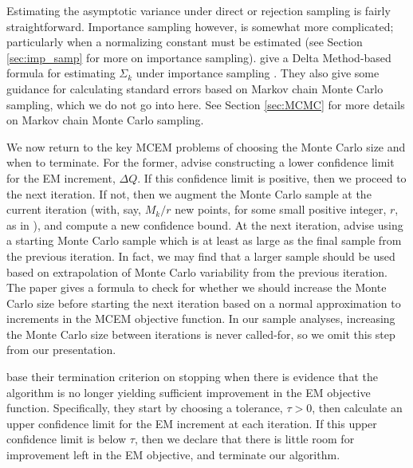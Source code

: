 \documentclass[11pt, oneside]{article}   	%
\begin{document}
Estimating the asymptotic variance under direct or rejection sampling is fairly straightforward. Importance sampling however, is somewhat more complicated; particularly when a normalizing constant must be estimated (see Section \ref{sec:imp_samp} for more on importance sampling). \citeauthor{Caf05} give a Delta Method-based formula for estimating $\Sigma_k$ under importance sampling \citep[see Chapter 3 of][for an overview of the Delta Method]{van98}. They also give some guidance for calculating standard errors based on Markov chain Monte Carlo sampling, which we do not go into here. See Section \ref{sec:MCMC} for more details on Markov chain Monte Carlo sampling. 

We now return to the key MCEM problems of choosing the Monte Carlo size and when to terminate. For the former, \citeauthor{Caf05} advise constructing a lower confidence limit for the EM increment, $\Delta Q$. If this confidence limit is positive, then we proceed to the next iteration. If not, then we augment the Monte Carlo sample at the current iteration (with, say, $M_k/r$ new points, for some small positive integer, $r$, as in \citealp{Boo99}), and compute a new confidence bound. At the next iteration, \citeauthor{Caf05} advise using a starting Monte Carlo sample which is at least as large as the final sample from the previous iteration. In fact, we may find that a larger sample should be used based on extrapolation of Monte Carlo variability from the previous iteration. The paper gives a formula to check for whether we should increase the Monte Carlo size before starting the next iteration based on a normal approximation to increments in the MCEM objective function. In our sample analyses, increasing the Monte Carlo size between iterations is never called-for, so we omit this step from our presentation.

\citeauthor{Caf05} base their termination criterion on stopping when there is evidence that the algorithm is no longer yielding sufficient improvement in the EM objective function. Specifically, they start by choosing a tolerance, $\tau>0$, then calculate an upper confidence limit for the EM increment at each iteration. If this upper confidence limit is below $\tau$, then we declare that there is little room for improvement left in the EM objective, and terminate our algorithm.
\end{document}
